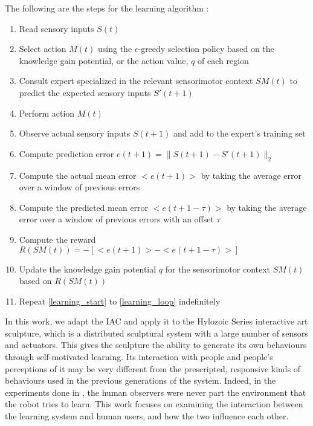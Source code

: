 The following are the steps for the learning algorithm \cite{Oudeyer2007}:

\begin{enumerate}
	\item \label{learning_start} Read sensory inputs $S(t)$
	\item Select action $M(t)$ using the $\epsilon$-greedy selection policy based on the knowledge gain potential, or the action value, $q$ of each region
	\item Consult expert specialized in the relevant sensorimotor context $SM(t)$ to predict the expected sensory inputs $S'(t+1)$
	\item Perform action $M(t)$
	\item Observe actual sensory inputs $S(t+1)$ and add to the expert's training set
	\item Compute prediction error $e(t+1) = \|S(t+1) - S'(t+1)\|_2$
	\item Compute the actual mean error $<e(t+1)>$ by taking the average error over a window of previous errors
	\item Compute the predicted mean error $<e(t+1-\tau)>$ by taking the average error over a window of previous errors with an offset $\tau$
	\item Compute the reward $R(SM(t)) = -[<e(t+1)> - <e(t+1-\tau)>]$
	\item Update the knowledge gain potential $q$ for the sensorimotor context $SM(t)$ based on $R(SM(t))$
	\item \label{learning_loop} Repeat \ref{learning_start} to \ref{learning_loop} indefinitely
\end{enumerate}

In this work, we adapt the IAC and apply it to the Hylozoic Series interactive art sculpture, which is a distributed sculptural system with a large number of sensors and actuators. This gives the sculpture the ability to generate its own behaviours through self-motivated learning. Its interaction with people and people's perceptions of it may be very different from the prescripted, responsive kinds of behaviours used in the previous generations of the system. Indeed, in the experiments done in \cite{Oudeyer2007}, the human observers were never part the environment that the robot tries to learn. This work focuses on examining the interaction between the learning system and human users, and how the two influence each other.

